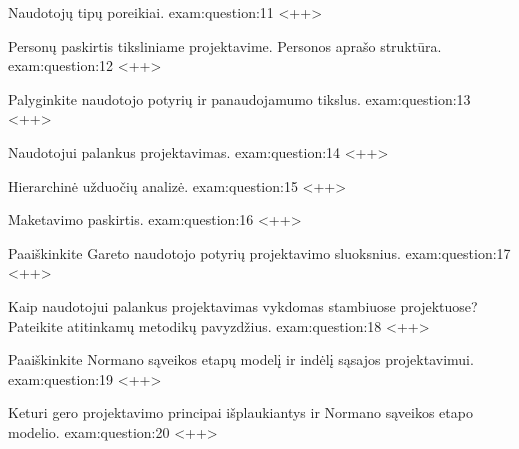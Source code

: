 \begin{question}{%
  Naudotojų tipų poreikiai.
  }{exam:question:11}
  <++>
\end{question}

\begin{question}{%
  Personų paskirtis tiksliniame projektavime. Personos aprašo struktūra.
  }{exam:question:12}
  <++>
\end{question}

\begin{question}{%
  Palyginkite naudotojo potyrių ir panaudojamumo tikslus.
  }{exam:question:13}
  <++>
\end{question}

\begin{question}{%
  Naudotojui palankus projektavimas.
  }{exam:question:14}
  <++>
\end{question}

\begin{question}{%
  Hierarchinė užduočių analizė.
  }{exam:question:15}
  <++>
\end{question}

\begin{question}{%
  Maketavimo paskirtis.
  }{exam:question:16}
  <++>
\end{question}

\begin{question}{%
  Paaiškinkite Gareto naudotojo potyrių projektavimo sluoksnius.
  }{exam:question:17}
  <++>
\end{question}

\begin{question}{%
  Kaip naudotojui palankus projektavimas vykdomas stambiuose projektuose?
  Pateikite atitinkamų metodikų pavyzdžius.
  }{exam:question:18}
  <++>
\end{question}

\begin{question}{%
  Paaiškinkite Normano sąveikos etapų modelį ir indėlį sąsajos
  projektavimui.
  }{exam:question:19}
  <++>
\end{question}

\begin{question}{%
  Keturi gero projektavimo principai išplaukiantys ir Normano sąveikos
  etapo modelio.
  }{exam:question:20}
  <++>
\end{question}
